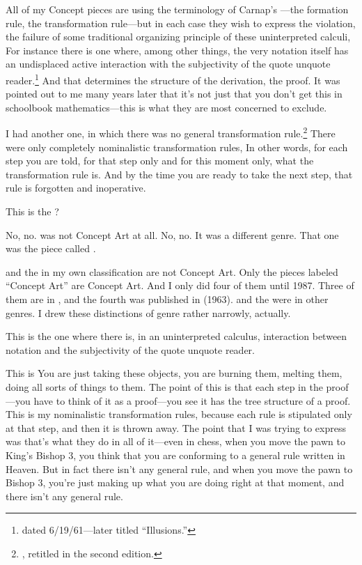 All of my Concept pieces are using the terminology of Carnap's 
---the formation rule, the transformation 
rule---but in each case they wish to express the violation, the failure of 
some traditional organizing principle of these uninterpreted calculi, 
For instance there is one where, among other things, the very notation 
itself has an undisplaced active interaction with the subjectivity of the 
quote unquote reader.\footnote{dated 6/19/61---later titled \enquote{Illusions.}} 
And that determines the structure of the derivation, the proof. 
It was pointed out to me many years later that it's not 
just that you don't get this in schoolbook mathematics---this is what 
they are most concerned to exclude. 

I had another one, in which there was no general transformation 
rule.\footnote{, retitled  in the second edition.}
There were only completely nominalistic transformation rules, 
In other words, for each step you are told, for that step only and for this 
moment only, what the transformation rule is. And by the time you are 
ready to take the next step, that rule is forgotten and inoperative. 

 This is the ? 

 No, no.  was not Concept Art at 
all. No, no. It was a different genre. That one was the piece called 
.

 and the  in my 
own classification are not Concept Art. Only the pieces labeled 
\enquote{Concept Art} are Concept Art. And I only did four of them until 1987. 
Three of them are in , and the fourth was published in 
 (1963).  and the 
 were in other genres. I drew these distinctions of genre 
rather narrowly, actually. 

This is the one  where there 
is, in an uninterpreted calculus, interaction between notation and the 
subjectivity of the quote unquote reader. 

This is  You are just taking these objects, you 
are burning them, melting them, doing all sorts of things to them. The 
point of this is that each step in the proof---you have to think of it as a 
proof---you see it has the tree structure of a proof. This is my nominalistic 
transformation rules, because each rule is stipulated only at that 
step, and then it is thrown away. The point that I was trying to express 
was that's what they do in all of it---even in chess, when you move the 
pawn to King's Bishop 3, you think that you are conforming to a 
general rule written in Heaven. But in fact there isn't any general rule, 
and when you move the pawn to Bishop 3, you're just making up what 
you are doing right at that moment, and there isn't any general rule. 

